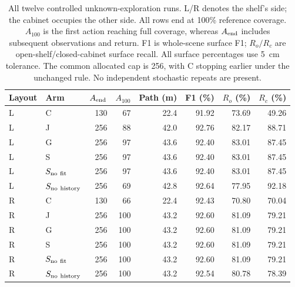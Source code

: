 \begin{table}[htbp]
\centering\small
\setlength{\tabcolsep}{4pt}
\caption{All twelve controlled unknown-exploration runs. L/R denotes the shelf's side; the cabinet occupies the other side. All rows end at 100\% reference coverage. $A_{100}$ is the first action reaching full coverage, whereas $A_{\rm end}$ includes subsequent observations and return. F1 is whole-scene surface F1; $R_o/R_c$ are open-shelf/closed-cabinet surface recall. All surface percentages use 5~cm tolerance. The common allocated cap is 256, with C stopping earlier under the unchanged rule. No independent stochastic repeats are present.}
\label{tab:dual-template-results}
\begin{tabular}{llrrrrrr}
\toprule
Layout & Arm & $A_{\rm end}$ & $A_{100}$ & Path (m) & F1 (\%) & $R_o$ (\%) & $R_c$ (\%) \\
\midrule
L & C & 130 & 67 & 22.4 & 91.92 & 73.69 & 49.26 \\
L & J & 256 & 88 & 42.0 & 92.76 & 82.17 & 88.71 \\
L & G & 256 & 97 & 43.6 & 92.40 & 83.01 & 87.45 \\
L & S & 256 & 97 & 43.6 & 92.40 & 83.01 & 87.45 \\
L & $S_{\rm no\ fit}$ & 256 & 97 & 43.6 & 92.40 & 83.01 & 87.45 \\
L & $S_{\rm no\ history}$ & 256 & 69 & 42.8 & 92.64 & 77.95 & 92.18 \\
\midrule
R & C & 130 & 66 & 22.4 & 92.43 & 70.80 & 70.04 \\
R & J & 256 & 100 & 43.2 & 92.60 & 81.09 & 79.21 \\
R & G & 256 & 100 & 43.2 & 92.60 & 81.09 & 79.21 \\
R & S & 256 & 100 & 43.2 & 92.60 & 81.09 & 79.21 \\
R & $S_{\rm no\ fit}$ & 256 & 100 & 43.2 & 92.60 & 81.09 & 79.21 \\
R & $S_{\rm no\ history}$ & 256 & 100 & 43.2 & 92.54 & 80.78 & 78.39 \\
\bottomrule
\end{tabular}
\end{table}
